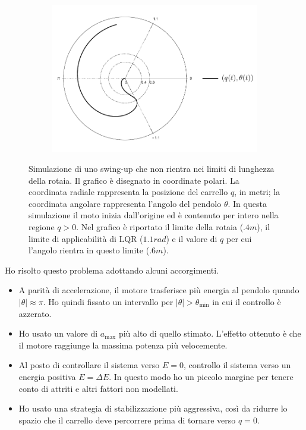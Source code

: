 \begin{figure}[h]
    \centering
    \begin{subfigure}[]{\textwidth}
        \centering
        \includegraphics[width=.8\textwidth]{assets/polar-swingup-simulation}
    \end{subfigure}

    \caption[Simulazione swing-up fallito]{
        Simulazione di uno swing-up che non rientra nei limiti di lunghezza della
        rotaia. Il grafico è disegnato in coordinate polari.
        La coordinata radiale rappresenta la posizione del carrello $q$, in metri;
        la coordinata angolare rappresenta l'angolo del pendolo $\theta$.
        In questa simulazione il moto inizia dall'origine ed è contenuto
        per intero nella regione $q > 0$.
        Nel grafico è riportato il limite della rotaia ($.4m$), il limite
        di applicabilità di LQR ($1.1rad$) e il valore di $q$ per cui l'angolo
        rientra in questo limite ($.6m$).
    }
    \label{fig:swingup-overflow}
\end{figure}

Ho risolto questo problema adottando alcuni accorgimenti.
\begin{itemize}
    \item A parità di accelerazione, il motore trasferisce più
    energia al pendolo quando $|\theta| \approx \pi$.\footnotemark
    Ho quindi fissato un intervallo per $|\theta| > \theta_{\min} $ in cui il
    controllo è azzerato.

    \item Ho usato un valore di $a_{\max}$ più alto di quello
    stimato. L'effetto ottenuto è che il motore raggiunge la massima
    potenza più velocemente.

    \item Al posto di controllare il sistema verso $E = 0$,
    controllo il sistema verso un energia positiva $E = \Delta E$.
    In questo modo ho un piccolo margine per tenere conto di attriti
    e altri fattori non modellati.

    \item Ho usato una strategia di stabilizzazione più aggressiva,
    così da ridurre lo spazio che il carrello deve percorrere prima
    di tornare verso $q = 0$.
\end{itemize}

